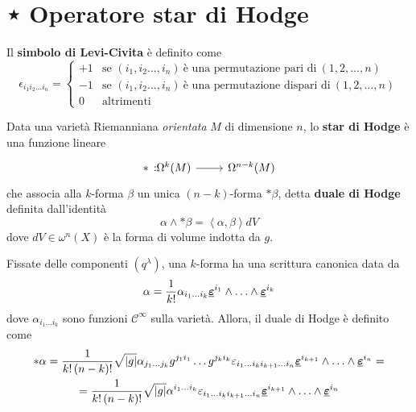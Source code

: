 \section{⋆ Operatore star di Hodge}
\begin{define}
	Il \textbf{simbolo di Levi-Civita} è definito come
	\begin{equation}
		\epsilon_{i_1i_2\ldots i_n}=\begin{cases}
			+1&\text{se }\left(i_1,i_2\ldots,i_n\right)\ \text{è una permutazione pari di}\ (1,2,\ldots, n)\\
			-1&\text{se }\left(i_1,i_2\ldots,i_n\right)\ \text{è una permutazione dispari di}\ (1,2,\ldots, n)\\
			0&\text{altrimenti}
		\end{cases}
	\end{equation}
\end{define}
\begin{define}%
	Data una varietà Riemanniana \textit{orientata} $M$ di dimensione $n$, lo \textbf{star di Hodge} è una funzione lineare
	\begin{equation*}
		\funz[\ast]{\Omega^k(M)}{\Omega^{n-k}(M)}
	\end{equation*}
	che associa alla $k$-forma $\beta$ un unica $(n-k)$-forma $\ast\beta$, detta \textbf{duale di Hodge} definita dall'identità
	\begin{equation}%
		\alpha\wedge\ast\beta=\left<\alpha,\beta\right>dV
	\end{equation}
	dove $dV\in\omega^n(X)$ è la forma di volume indotta da $g$.
\end{define}
Fissate delle componenti $\left(q^\lambda\right)$, una $k$-forma ha una scrittura canonica data da
\begin{equation}
	\alpha=\frac{1}{k!}\alpha_{i_1\ldots i_k}\vb*{\underline{\varepsilon}}^{i_1}\wedge\ldots\wedge\vb*{\underline{\varepsilon}}^{i_k}
\end{equation}
dove $\alpha_{i_1\ldots i_k}$ sono funzioni $\mathcal{C}^{\infty}$ sulla varietà. Allora, il duale di Hodge è definito come
\begin{multline*}
\ast\alpha=\frac{1}{k!\left(n-k\right)!}\sqrt{\abs{g}}\alpha_{j_1\ldots j_k}g^{j_1i_1}\ldots g^{j_ki_k}\varepsilon_{i_1\ldots i_ki_{k+1}\ldots i_n}\vb*{\underline{\varepsilon}}^{i_{k+1}}\wedge\ldots\wedge\vb*{\underline{\varepsilon}}^{i_n}=\\
=\frac{1}{k!\left(n-k\right)!}\sqrt{\abs{g}}\alpha^{i_1\ldots i_k}\varepsilon_{i_1\ldots i_ki_{k+1}\ldots i_n}\vb*{\underline{\varepsilon}}^{i_{k+1}}\wedge\ldots\wedge\vb*{\underline{\varepsilon}}^{i_n}
\end{multline*}
